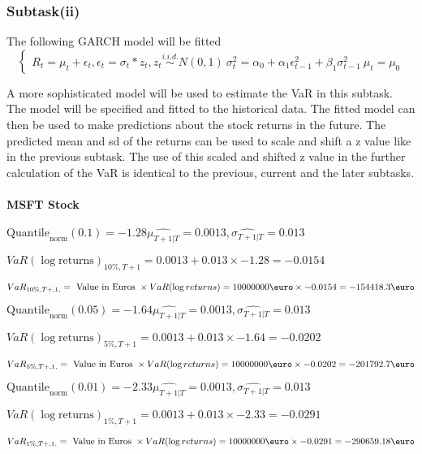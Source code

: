 \subsubsection{Subtask(ii)}
 The following GARCH model will be fitted 
$$\begin{cases} R_t = \mu_t + \epsilon_t, \epsilon_t = \sigma_t  * z_t, z_t \overset{i.i.d.}{\sim} N(0,1) \ \sigma^2_t = \alpha_0 + \alpha_1 \epsilon^2_{t-1} + \beta_1 \sigma^2_{t-1} \ \mu_t = \mu_0 \end{cases}$$

A more sophisticated model will be used to estimate the VaR in this subtask. 
The model will be specified and fitted to the historical data. The fitted model can then be used to make predictions about the stock returns in the future. The predicted mean and sd of the returns can be used to scale and shift a z value like in the previous subtask.
The use of this scaled and shifted z value in the further calculation of the VaR is identical to the previous, current and the later subtasks.
\paragraph{MSFT Stock}


$\text{Quantile}_\text{norm}(0.1) = -1.28$$\hat{\mu_{T+1|T}} = 0.0013, \hat{\sigma_{T+1|T}} = 0.013$

$VaR(\log \text{returns})_{10\%, T + 1} = 0.0013 + 0.013\times-1.28 = -0.0154$

$VaR_{10\%, T + ,1,} = \text{ Value in Euros } \times VaR(\log returns) = 10 000 000 \text{\euro} \times-0.0154 = -154418.3 \text{\euro}$


$\text{Quantile}_\text{norm}(0.05) = -1.64$$\hat{\mu_{T+1|T}} = 0.0013, \hat{\sigma_{T+1|T}} = 0.013$

$VaR(\log \text{returns})_{5\%, T + 1} = 0.0013 + 0.013\times-1.64 = -0.0202$

$VaR_{5\%, T + ,1,} = \text{ Value in Euros } \times VaR(\log returns) = 10 000 000 \text{\euro} \times-0.0202 = -201792.7 \text{\euro}$


$\text{Quantile}_\text{norm}(0.01) = -2.33$$\hat{\mu_{T+1|T}} = 0.0013, \hat{\sigma_{T+1|T}} = 0.013$

$VaR(\log \text{returns})_{1\%, T + 1} = 0.0013 + 0.013\times-2.33 = -0.0291$

$VaR_{1\%, T + ,1,} = \text{ Value in Euros } \times VaR(\log returns) = 10 000 000 \text{\euro} \times-0.0291 = -290659.18 \text{\euro}$



